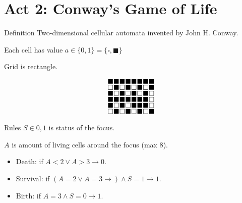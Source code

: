 \documentclass[presentation,aspectratio=169,smaller]{beamer}
\begin{document}
\section{Act 2: Conway's Game of Life}
\label{sec:org444fdce}

\begin{frame}[label={sec:org5c6a0ac}]{Definition}
Two-dimensional cellular automata invented by John H. Conway.

\pause

Each cell has value \(a \in \lbrace 0, 1 \rbrace = \lbrace \square, \blacksquare
\rbrace\)

\pause

Grid is rectangle.

\begin{equation*}
  \begingroup
  \setlength\arraycolsep{0.25pt}
  \renewcommand{\arraystretch}{0.5}
  \begin{matrix}
    \blacksquare & \blacksquare & \blacksquare & \blacksquare & \blacksquare & \blacksquare & \blacksquare & \blacksquare \\
    \square      & \blacksquare & \square      & \blacksquare & \square      & \blacksquare & \square      & \blacksquare \\
    \blacksquare & \square      & \blacksquare & \square      & \blacksquare & \square      & \blacksquare & \square \\
    \blacksquare & \blacksquare & \blacksquare & \blacksquare & \blacksquare & \blacksquare & \blacksquare & \square \\
    \blacksquare & \square      & \blacksquare & \square      & \blacksquare & \blacksquare & \blacksquare & \square \\
    \square      & \blacksquare & \square      & \blacksquare & \square      & \blacksquare & \square      & \blacksquare \\
  \end{matrix}
  \endgroup
\end{equation*}
\end{frame}

\begin{frame}[label={sec:orga191f82}]{Rules}
\(S \in {0, 1}\) is status of the focus.

\(A\) is amount of living cells around the focus (max \(8\)).

\begin{itemize}
\item Death: if \(A < 2 \vee A > 3 \to 0\).
\item Survival: if \((A = 2 \vee A = 3 \to) \wedge S = 1 \to 1\).
\item Birth: if \(A = 3 \wedge S = 0 \to 1\).
\end{itemize}
\end{frame}
\end{document}
